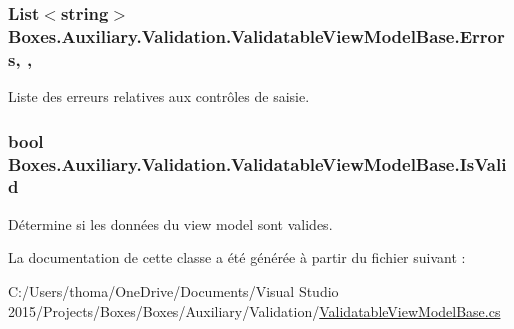 \subsubsection[{\texorpdfstring{Errors}{Errors}}]{\setlength{\rightskip}{0pt plus 5cm}List$<$string$>$ Boxes.\+Auxiliary.\+Validation.\+Validatable\+View\+Model\+Base.\+Errors\hspace{0.3cm}{\ttfamily [get]}, {\ttfamily [set]}, {\ttfamily [protected]}}\hypertarget{class_boxes_1_1_auxiliary_1_1_validation_1_1_validatable_view_model_base_ac04552e5542cbbea74c7c3a976cc18fd}{}\label{class_boxes_1_1_auxiliary_1_1_validation_1_1_validatable_view_model_base_ac04552e5542cbbea74c7c3a976cc18fd}


Liste des erreurs relatives aux contrôles de saisie. 

\subsubsection[{\texorpdfstring{Is\+Valid}{IsValid}}]{\setlength{\rightskip}{0pt plus 5cm}bool Boxes.\+Auxiliary.\+Validation.\+Validatable\+View\+Model\+Base.\+Is\+Valid\hspace{0.3cm}{\ttfamily [get]}}\hypertarget{class_boxes_1_1_auxiliary_1_1_validation_1_1_validatable_view_model_base_a7eebf12b7e06be874c19715dad377aea}{}\label{class_boxes_1_1_auxiliary_1_1_validation_1_1_validatable_view_model_base_a7eebf12b7e06be874c19715dad377aea}


Détermine si les données du view model sont valides. 



La documentation de cette classe a été générée à partir du fichier suivant \+:\begin{DoxyCompactItemize}
\item 
C\+:/\+Users/thoma/\+One\+Drive/\+Documents/\+Visual Studio 2015/\+Projects/\+Boxes/\+Boxes/\+Auxiliary/\+Validation/\hyperlink{_validatable_view_model_base_8cs}{Validatable\+View\+Model\+Base.\+cs}\end{DoxyCompactItemize}
